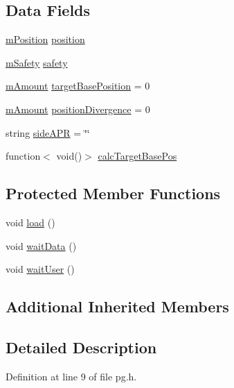 \subsection*{Data Fields}
\begin{DoxyCompactItemize}
\item 
\hyperlink{struct_k_1_1m_position}{m\+Position} \hyperlink{class_k_1_1_p_g_afa6993a0243f938ec8a0b7a0ebc7a4d6}{position}
\item 
\hyperlink{struct_k_1_1m_safety}{m\+Safety} \hyperlink{class_k_1_1_p_g_a03dcb43533cb6cabba43716d9207b789}{safety}
\item 
\hyperlink{km_8h_ad4d00888c55a47a8a40ed8020d176086}{m\+Amount} \hyperlink{class_k_1_1_p_g_a41f7e688e22528d01be7373457b533c0}{target\+Base\+Position} = 0
\item 
\hyperlink{km_8h_ad4d00888c55a47a8a40ed8020d176086}{m\+Amount} \hyperlink{class_k_1_1_p_g_a158e860ce785d482b11cf81a6544cbd6}{position\+Divergence} = 0
\item 
string \hyperlink{class_k_1_1_p_g_af1d15671cf0f5d0d6c5ebac51f08bae1}{side\+A\+PR} = \char`\"{}\char`\"{}
\item 
function$<$ void()$>$ \hyperlink{class_k_1_1_p_g_a26ec2609ea48e49b3c4a482b6fe9fd38}{calc\+Target\+Base\+Pos}
\end{DoxyCompactItemize}
\subsection*{Protected Member Functions}
\begin{DoxyCompactItemize}
\item 
void \hyperlink{class_k_1_1_p_g_a78f61ac2dd03bcba8e09ca20cd7d68e3}{load} ()
\item 
void \hyperlink{class_k_1_1_p_g_aa9a0f090ee360e2a9f967200d30f4a22}{wait\+Data} ()
\item 
void \hyperlink{class_k_1_1_p_g_aa3f7b56799f5915cfbc902f6426c2bb2}{wait\+User} ()
\end{DoxyCompactItemize}
\subsection*{Additional Inherited Members}


\subsection{Detailed Description}


Definition at line 9 of file pg.\+h.



